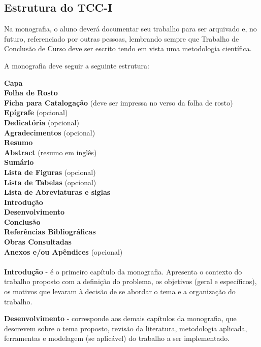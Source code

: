 \subsection{Estrutura do TCC-I}

Na monografia, o aluno dever\'{a} documentar seu trabalho para ser arquivado e, no futuro, referenciado por outras pessoas, lembrando sempre que Trabalho de Conclus\~{a}o de Curso deve ser escrito tendo em vista uma metodologia cient\'{i}fica. 

A monografia deve seguir a seguinte estrutura: 
	
	\indent \textbf{Capa} \\
	\indent \textbf{Folha de Rosto} \\
	\indent \textbf{Ficha para Cataloga\c{c}\~{a}o} (deve ser impressa no verso da folha de rosto) \\
	\indent \textbf{Ep\'{i}grafe} (opcional) \\
	\indent \textbf{Dedicat\'{o}ria} (opcional) \\
	\indent \textbf{Agradecimentos} (opcional) \\
	\indent \textbf{Resumo} \\
	\indent \textbf{Abstract} (resumo em ingl\^{e}s) \\
	\indent \textbf{Sum\'{a}rio} \\
	\indent \textbf{Lista de Figuras} (opcional) \\
	\indent \textbf{Lista de Tabelas} (opcional) \\
	\indent \textbf{Lista de Abreviaturas e siglas} \\
	\indent \textbf{Introdu\c{c}\~{a}o} \\
	\indent \textbf{Desenvolvimento} \\
	\indent \textbf{Conclus\~{a}o} \\
	\indent \textbf{Refer\^{e}ncias Bibliogr\'{a}ficas} \\
	\indent \textbf{Obras Consultadas} \\
	\indent \textbf{Anexos e/ou Ap\^{e}ndices} (opcional) \\\\

\textbf{Introdu\c{c}\~{a}o} - \'{e} o primeiro cap\'{i}tulo da monografia. Apresenta o contexto do trabalho proposto com a defini\c{c}\~{a}o do problema, os objetivos (geral e espec\'{i}ficos), os motivos que levaram \`{a} decis\~{a}o de se abordar o tema e a organiza\c{c}\~{a}o do trabalho.

\textbf{Desenvolvimento} - corresponde aos demais cap\'{i}tulos da monografia, que descrevem sobre o tema proposto, revis\~{a}o da literatura, metodologia aplicada, ferramentas e modelagem (se aplic\'{a}vel) do trabalho a ser implementado.

